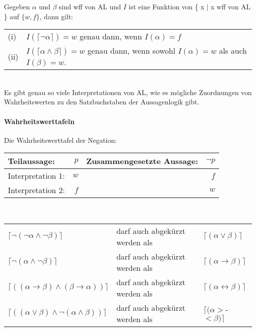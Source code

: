 \documentclass{scrartcl}
\begin{document}
Gegeben $ \alpha $ und $ \beta $ sind wff von AL und $ I $ ist eine Funktion von \{ x $ \mid $ x wff von AL \} auf $ \{ w,f \} $, dann gilt: \\

\begin{tabularx}{\linewidth}{l X}
	(i) & $ I(\lceil \neg \alpha \rceil) = w $ genau dann, wenn $ I(\alpha) = f $ \\
	(ii) & $ I(\lceil \alpha \wedge \beta \rceil) = w $ genau dann, wenn sowohl $ I(\alpha) = w $ als auch $ I(\beta) = w $.
\end{tabularx} \\

Es gibt genau so viele Interpretationen von AL, wie es mögliche Zuordnungen von Wahrheitswerten zu den Satzbuchstaben der Aussagenlogik gibt.

\paragraph{Wahrheitswerttafeln}

Die Wahrheitswerttafel der Negation: \\

\begin{tabular}{|l r|l r|}
	\hline
	Teilaussage: & $ p $ & Zusammengesetzte Aussage: & $ \neg p $ \\
	\hline
	Interpretation 1: & $ w $ & & $ f $ \\
	\hline
	Interpretation 2: & $ f $ & & $ w $ \\
	\hline
\end{tabular} \\

\begin{tabularx}{\linewidth}{l l l}
	$ \lceil \neg (\neg \alpha \wedge \neg \beta) \rceil $ & darf auch abgekürzt werden als & $ \lceil (\alpha \vee \beta) \rceil $ \\
	$ \lceil \neg (\alpha \wedge \neg \beta) \rceil $ & darf auch abgekürzt werden als & $ \lceil (\alpha \rightarrow \beta) \rceil $ \\
	$ \lceil ((\alpha \rightarrow \beta) \wedge (\beta \rightarrow \alpha)) \rceil $ & darf auch abgekürzt werden als & $ \lceil (\alpha \leftrightarrow \beta) \rceil $ \\
	$ \lceil ((\alpha \vee \beta) \wedge \neg (\alpha \wedge \beta)) \rceil $ & darf auch abgekürzt werden als & $ \lceil (\alpha >$-$< \beta) \rceil $	
\end{tabularx} \\
\end{document}
